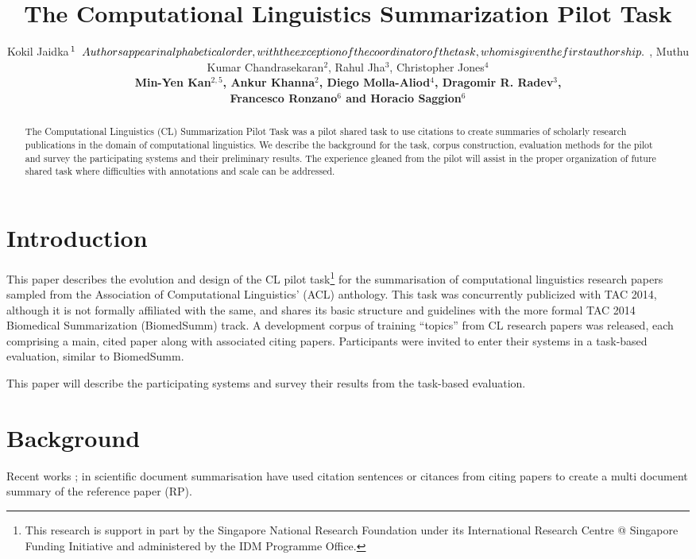 \documentclass[11pt]{article}
\title{The Computational Linguistics Summarization Pilot Task}
\author{Kokil Jaidka$^{1}\relax{\hspace{.2cm}Authors appear in alphabetical order, with the exception of the coordinator of the task, whom is given the first authorship.} $ , Muthu Kumar Chandrasekaran$^{2}$, Rahul Jha$^{3}$, Christopher Jones$^{4}$ \\ \bf{Min-Yen Kan}$^{2,5}$, Ankur Khanna$^{2}$, Diego Molla-Aliod$^{4}$, Dragomir R. Radev$^{3}$, \\ \bf{Francesco Ronzano}$^{6}$ and Horacio Saggion$^{6}$ \\
}
\date{}
\begin{document}
\maketitle
\begin{abstract}
The Computational Linguistics (CL) Summarization Pilot Task was a
pilot shared task to use citations to create summaries of scholarly
research publications in the domain of computational linguistics.  We
describe the background for the task, corpus construction, evaluation
methods for the pilot and survey the participating systems and their
preliminary results.  The experience gleaned from the pilot will
assist in the proper organization of future shared task where
difficulties with annotations and scale can be addressed.
\end{abstract}

\section{Introduction}

This paper describes the evolution and design of the CL pilot
task\footnote{This research is support in part by the Singapore
  National Research Foundation under its International Research Centre
  @ Singapore Funding Initiative and administered by the IDM Programme
  Office.} for the summarisation of computational linguistics
research papers sampled from the Association of Computational
Linguistics' (ACL) anthology.  This task was concurrently publicized
with TAC 2014, although it is not formally affiliated with the same,
and shares its basic structure and guidelines with the more formal TAC
2014 Biomedical Summarization (BiomedSumm) track. A development corpus
of training ``topics'' from CL research papers was released, each
comprising a main, cited paper along with associated citing
papers. Participants were invited to enter their systems in a
task-based evaluation, similar to BiomedSumm.

This paper will describe the participating systems and survey their 
results from the task-based evaluation.

\section{Background}
Recent works \cite{mohammad2009};\cite{abu2011} in scientific document 
summarisation have used citation sentences or citances from citing  papers 
to create a multi document summary of the reference paper (RP). 
\end{document}
